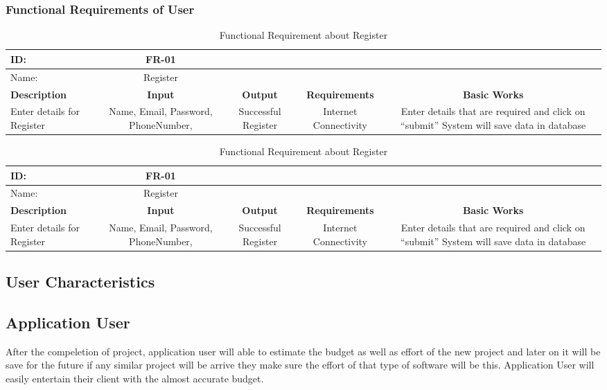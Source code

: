     \subsubsection{Functional Requirements of User}
    \begin{table}[H]
    \begin{tabular}{|l|c|c|c|c|}
        \hline
    \bfseries ID: &\bfseries FR-01\\
    \hline
    Name:&Register\\
    \hline
    \bfseries Description&\bfseries Input&\bfseries Output &\bfseries Requirements&\bfseries Basic Works\\
    \hline
    Enter details for Register& Name, Email, Password, PhoneNumber, & Successful Register & Internet Connectivity&Enter details that are required and click on “submit” System will save data in database\\
    \hline
    \end{tabular}
    \caption{Functional Requirement about Register}   
    
    \begin{tabular}{|l|c|c|c|c|}
        \hline
    \bfseries ID: &\bfseries FR-01\\
    \hline
    Name:&Register\\
    \hline
    \bfseries Description&\bfseries Input&\bfseries Output &\bfseries Requirements&\bfseries Basic Works\\
    \hline
    Enter details for Register& Name, Email, Password, PhoneNumber, & Successful Register & Internet Connectivity&Enter details that are required and click on “submit” System will save data in database\\
    \hline
    \end{tabular}
    \caption{Functional Requirement about Register}   
    
    
    \end{table}
    

    \subsection{User Characteristics}
    \subsection*{Application User}
    After the compeletion of project, application user will able to estimate the budget as well as effort of the new project and later on it will be save for the future if any similar project will be arrive they make sure the effort of that type of software will be this.
    Application User will easily entertain their client with the almost accurate budget. 
